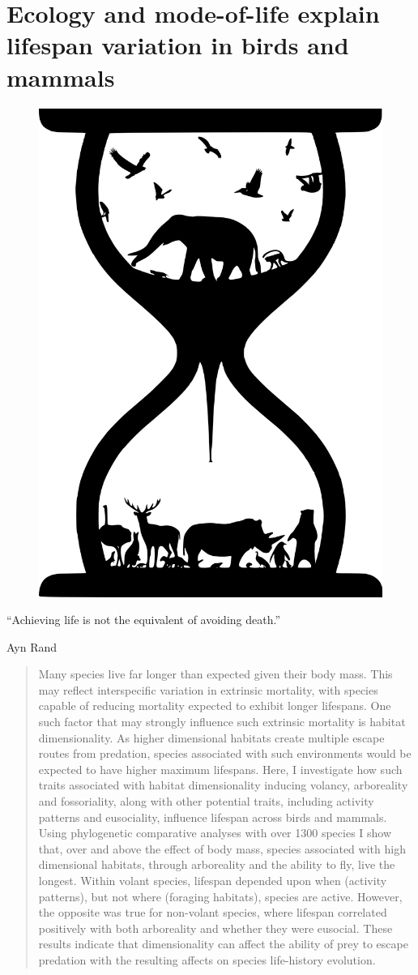 \chapter[Longevity]{Ecology and mode-of-life explain lifespan variation in birds and mammals}
\label{chap:Longevity}


\begin{figure}[h]
  \centering
  \includegraphics[width=.20\textwidth]{ch3-longevity/long.png}
\end{figure}


\begin{quoteshrink}
  ``Achieving life is not the equivalent of avoiding death.''
  
\hfill{Ayn Rand}
\end{quoteshrink}




\begin{abstract}
Many species live far longer than expected given their body mass. This may reflect interspecific variation in extrinsic mortality, with species capable of reducing mortality expected to exhibit longer lifespans. One such factor that may strongly influence such extrinsic mortality is habitat dimensionality. As higher dimensional habitats create multiple escape routes from predation, species associated with such environments would be expected to have higher maximum lifespans. Here, I investigate how such traits associated with habitat dimensionality inducing volancy, arboreality and fossoriality, along with other potential traits, including activity patterns and eusociality, influence lifespan across birds and mammals. Using phylogenetic comparative analyses with over 1300 species I show that, over and above the effect of body mass, species associated with high dimensional habitats, through arboreality and the ability to fly, live the longest. Within volant species, lifespan depended upon when (activity patterns), but not where (foraging habitats), species are active. However, the opposite was true for non-volant species, where lifespan correlated positively with both arboreality and whether they were eusocial. These results indicate that dimensionality can affect the ability of prey to escape predation with the resulting affects on species life-history evolution. 

\end{abstract}

